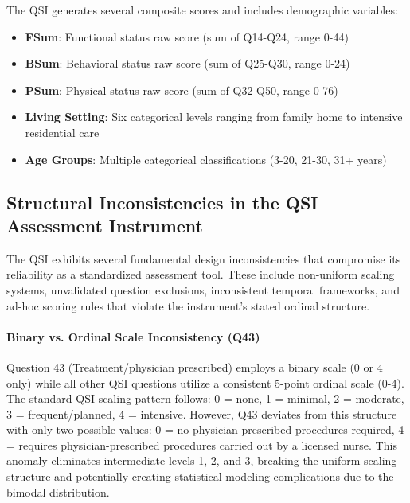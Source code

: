 The QSI generates several composite scores and includes demographic variables:

\begin{itemize}
    \item \textbf{FSum}: Functional status raw score (sum of Q14-Q24, range 0-44)
    \item \textbf{BSum}: Behavioral status raw score (sum of Q25-Q30, range 0-24)
    \item \textbf{PSum}: Physical status raw score (sum of Q32-Q50, range 0-76)
    \item \textbf{Living Setting}: Six categorical levels ranging from family home to intensive residential care
    \item \textbf{Age Groups}: Multiple categorical classifications (3-20, 21-30, 31+ years)
\end{itemize}

\subsection{Structural Inconsistencies in the QSI Assessment Instrument}

The QSI exhibits several fundamental design inconsistencies that compromise its reliability as a standardized assessment tool. These include non-uniform scaling systems, unvalidated question exclusions, inconsistent temporal frameworks, and ad-hoc scoring rules that violate the instrument's stated ordinal structure.

\paragraph{Binary vs. Ordinal Scale Inconsistency (Q43)}
Question 43 (Treatment/physician prescribed) employs a binary scale (0 or 4 only) while all other QSI questions utilize a consistent 5-point ordinal scale (0-4). The standard QSI scaling pattern follows: 0 = none, 1 = minimal, 2 = moderate, 3 = frequent/planned, 4 = intensive. However, Q43 deviates from this structure with only two possible values: 0 = no physician-prescribed procedures required, 4 = requires physician-prescribed procedures carried out by a licensed nurse. This anomaly eliminates intermediate levels 1, 2, and 3, breaking the uniform scaling structure and potentially creating statistical modeling complications due to the bimodal distribution.



